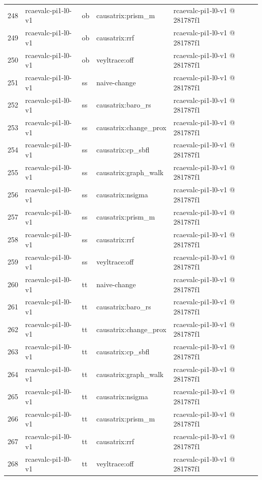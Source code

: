 \begin{longtable}{@{}r>{\raggedright\arraybackslash}p{87.0pt}>{\raggedright\arraybackslash}p{18.0pt}>{\raggedright\arraybackslash}p{63.0pt}>{\raggedright\arraybackslash}p{108.0pt}@{}}
248 & rcaevalc-pi1-l0-v1 & ob & causatrix:prism\_m & rcaevalc-pi1-l0-v1 @ 281787f1 \\
249 & rcaevalc-pi1-l0-v1 & ob & causatrix:rrf & rcaevalc-pi1-l0-v1 @ 281787f1 \\
250 & rcaevalc-pi1-l0-v1 & ob & veyltrace:off & rcaevalc-pi1-l0-v1 @ 281787f1 \\
251 & rcaevalc-pi1-l0-v1 & ss & naive-change & rcaevalc-pi1-l0-v1 @ 281787f1 \\
252 & rcaevalc-pi1-l0-v1 & ss & causatrix:baro\_rs & rcaevalc-pi1-l0-v1 @ 281787f1 \\
253 & rcaevalc-pi1-l0-v1 & ss & causatrix:change\_prox & rcaevalc-pi1-l0-v1 @ 281787f1 \\
254 & rcaevalc-pi1-l0-v1 & ss & causatrix:cp\_sbfl & rcaevalc-pi1-l0-v1 @ 281787f1 \\
255 & rcaevalc-pi1-l0-v1 & ss & causatrix:graph\_walk & rcaevalc-pi1-l0-v1 @ 281787f1 \\
256 & rcaevalc-pi1-l0-v1 & ss & causatrix:nsigma & rcaevalc-pi1-l0-v1 @ 281787f1 \\
257 & rcaevalc-pi1-l0-v1 & ss & causatrix:prism\_m & rcaevalc-pi1-l0-v1 @ 281787f1 \\
258 & rcaevalc-pi1-l0-v1 & ss & causatrix:rrf & rcaevalc-pi1-l0-v1 @ 281787f1 \\
259 & rcaevalc-pi1-l0-v1 & ss & veyltrace:off & rcaevalc-pi1-l0-v1 @ 281787f1 \\
260 & rcaevalc-pi1-l0-v1 & tt & naive-change & rcaevalc-pi1-l0-v1 @ 281787f1 \\
261 & rcaevalc-pi1-l0-v1 & tt & causatrix:baro\_rs & rcaevalc-pi1-l0-v1 @ 281787f1 \\
262 & rcaevalc-pi1-l0-v1 & tt & causatrix:change\_prox & rcaevalc-pi1-l0-v1 @ 281787f1 \\
263 & rcaevalc-pi1-l0-v1 & tt & causatrix:cp\_sbfl & rcaevalc-pi1-l0-v1 @ 281787f1 \\
264 & rcaevalc-pi1-l0-v1 & tt & causatrix:graph\_walk & rcaevalc-pi1-l0-v1 @ 281787f1 \\
265 & rcaevalc-pi1-l0-v1 & tt & causatrix:nsigma & rcaevalc-pi1-l0-v1 @ 281787f1 \\
266 & rcaevalc-pi1-l0-v1 & tt & causatrix:prism\_m & rcaevalc-pi1-l0-v1 @ 281787f1 \\
267 & rcaevalc-pi1-l0-v1 & tt & causatrix:rrf & rcaevalc-pi1-l0-v1 @ 281787f1 \\
268 & rcaevalc-pi1-l0-v1 & tt & veyltrace:off & rcaevalc-pi1-l0-v1 @ 281787f1 \\

\end{longtable}
